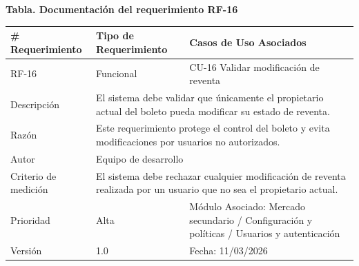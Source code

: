 \documentclass[12pt,letterpaper]{article}
\begin{document}
\noindent
\begin{minipage}{\textwidth}
\centering
\scriptsize
\renewcommand{\arraystretch}{0.9}
\setlength{\tabcolsep}{3pt}
\setlength{\arrayrulewidth}{0.5pt}

\textbf{Tabla. Documentación del requerimiento RF-16}

\vspace{2pt}

\begin{tabularx}{\textwidth}{|p{2.6cm}|X|p{3.4cm}|}
\hline
\# Requerimiento & Tipo de Requerimiento & Casos de Uso Asociados \\ \hline
RF-16 & Funcional & CU-16 Validar modificación de reventa \\ \hline
Descripción & \multicolumn{2}{X|}{El sistema debe validar que únicamente el propietario actual del boleto pueda modificar su estado de reventa.} \\ \hline
Razón & \multicolumn{2}{X|}{Este requerimiento protege el control del boleto y evita modificaciones por usuarios no autorizados.} \\ \hline
Autor & \multicolumn{2}{X|}{Equipo de desarrollo} \\ \hline
Criterio de medición & \multicolumn{2}{X|}{El sistema debe rechazar cualquier modificación de reventa realizada por un usuario que no sea el propietario actual.} \\ \hline
Prioridad & Alta & Módulo Asociado: Mercado secundario / Configuración y políticas / Usuarios y autenticación \\ \hline
Versión & 1.0 & Fecha: 11/03/2026 \\ \hline
\end{tabularx}
\end{minipage}

\vspace{0.2cm}
\end{document}

